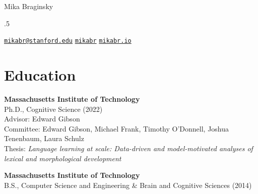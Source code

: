 \documentclass[11pt,]{article}
\begin{document}
\centerline{\huge Mika Braginsky}

\vspace{1.5 mm}

\footnotesize


\moveleft.5\hoffset\centerline{
      \scalebox{1.2}{\faEnvelope}\hspace{.5 mm}
    \href{mailto:}{\tt \href{mailto:mikabr@stanford.edu}{\nolinkurl{mikabr@stanford.edu}}} \hspace{2 mm}
        \scalebox{1.4}{\faGithub}\hspace{.5 mm}
    \href{http://github.com/mikabr}{\tt mikabr} \hspace{2 mm}
        \scalebox{1.2}{\faLink}\hspace{.5 mm}
    \href{http://mikabr.io}{\tt mikabr.io} \hspace{2 mm}
    }
\normalsize

\hypertarget{education}{%
\section{Education}\label{education}}

\textbf{Massachusetts Institute of Technology}\\
\hspace*{0.333em}\hspace*{0.333em}\hspace*{0.333em}Ph.D., Cognitive
Science (2022)\\
\hspace*{0.333em}\hspace*{0.333em}\hspace*{0.333em}Advisor: Edward
Gibson\\
\hspace*{0.333em}\hspace*{0.333em}\hspace*{0.333em}Committee: Edward
Gibson, Michael Frank, Timothy O'Donnell, Joshua Tenenbaum, Laura
Schulz\\
\hspace*{0.333em}\hspace*{0.333em}\hspace*{0.333em}Thesis:
\emph{Language learning at scale: Data-driven and model-motivated
analyses of lexical and morphological development}

\textbf{Massachusetts Institute of Technology}\\
\hspace*{0.333em}\hspace*{0.333em}\hspace*{0.333em}B.S., Computer
Science and Engineering \& Brain and Cognitive Sciences (2014)
\end{document}
